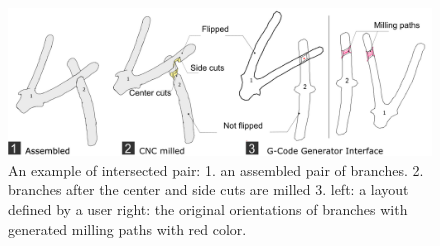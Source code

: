 \begin{figure}[H]
  \begin{center}
    \includegraphics[width = 0.4\paperwidth]{images/system/joint_milling_diagram_4.png}
    \caption{An example of intersected pair: 1. an assembled pair of branches. 2. branches after the center and side cuts are milled 3. left: a layout defined by a user right: the original orientations of branches with generated milling paths with red color.  }
    \label{fig:joint_geometry}
  \end{center}
\end{figure}

